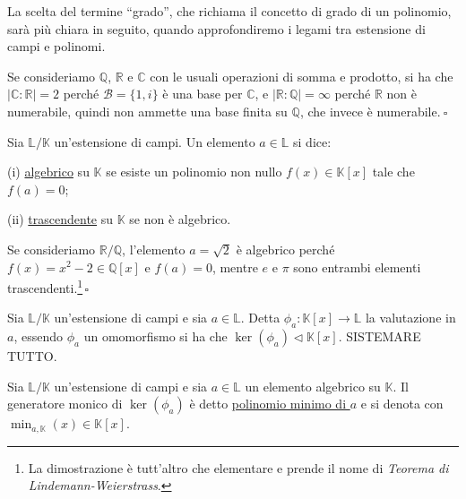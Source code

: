 \noindent La scelta del termine ``grado'', che richiama il concetto di grado di un polinomio, sarà più chiara in seguito, quando approfondiremo i legami tra estensione di campi e polinomi.
 
\begin{exm}Se consideriamo $\mathbb{Q}$, $\mathbb{R}$ e $\mathbb{C}$ con le usuali operazioni di somma e prodotto, si ha che $|\mathbb{C}: \mathbb{R}|=2$ perché $\mathcal{B}=\{1, i\}$ è una base per $\mathbb{C}$, e $|\mathbb{R}:\mathbb{Q}|=\infty$ perché $\mathbb{R}$ non è numerabile, quindi non ammette una base finita su $\mathbb{Q}$, che invece è numerabile$. \ \square$\end{exm}

\vspace{-2mm}

\begin{defn}[]{}
Sia $\mathbb{L}/\mathbb{K}$ un'estensione di campi. Un elemento $a\in \mathbb{L}$ si dice:

\noindent (i) \underline{algebrico} su $\mathbb{K}$ se esiste un polinomio non nullo $f(x)\in \mathbb{K}[x]$ tale che $f(a)=0$;

\noindent (ii) \underline{trascendente} su $\mathbb{K}$ se non è algebrico.
\end{defn}

\begin{exm}Se consideriamo $\mathbb{R}/\mathbb{Q}$, l'elemento $a=\sqrt{2}$ è algebrico perché $f(x)=x^2-2\in \mathbb{Q}[x]$ e $f(a)=0$, mentre $e$ e $\pi$ sono entrambi elementi trascendenti.\footnote{La dimostrazione è tutt'altro che elementare e prende il nome di \emph{Teorema di Lindemann-Weierstrass}.}$\, \square$\end{exm}

\noindent Sia $\mathbb{L}/\mathbb{K}$ un'estensione di campi e sia $a\in \mathbb{L}$. Detta $\phi_a\colon \mathbb{K}[x]\to \mathbb{L}$ la valutazione in $a$, essendo $\phi_a$ un omomorfismo si ha che $\ker(\phi_a)\lhd \mathbb{K}[x]$. SISTEMARE TUTTO.

\clearpage

\begin{defn}[]{}
Sia $\mathbb{L}/\mathbb{K}$ un'estensione di campi e sia $a\in \mathbb{L}$ un elemento algebrico su $\mathbb{K}$. Il generatore monico di $\ker(\phi_a)$ è detto \underline{polinomio minimo di $a$} e si denota con $\min_{a,\mathbb{K}}(x)\in \mathbb{K}[x]$.
\end{defn}

